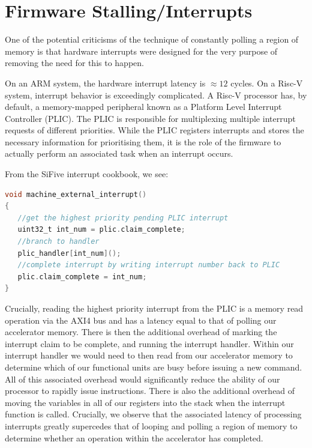 \documentclass[a4paper,8pt]{report}
\begin{document}
\section{Firmware Stalling/Interrupts}
One of the potential criticisms of the technique of constantly polling a region
of memory is that hardware interrupts were designed for the very purpose of
removing the need for this to happen.

On an ARM system, the hardware interrupt latency is $\approx 12$ cycles. On a
Risc-V system, interrupt behavior is exceedingly complicated. A Risc-V processor
has, by default, a memory-mapped peripheral known as a Platform Level Interrupt
Controller (PLIC). The PLIC is responsible for multiplexing multiple interrupt
requests of different priorities. While the PLIC registers interrupts and stores
the necessary information for prioritising them, it is the role of the firmware
to actually perform an associated task when an interrupt occurs.

From the SiFive interrupt cookbook, we see:
\begin{lstlisting}[language=C,style=customc]
void machine_external_interrupt()
{
   //get the highest priority pending PLIC interrupt
   uint32_t int_num = plic.claim_complete;
   //branch to handler
   plic_handler[int_num]();
   //complete interrupt by writing interrupt number back to PLIC
   plic.claim_complete = int_num;
}
\end{lstlisting}

Crucially, reading the highest priority interrupt from the PLIC is a memory
read operation via the AXI4 bus and has a latency equal to that of polling our
accelerator memory. There is then the additional overhead of marking the
interrupt claim to be complete, and running the interrupt handler. Within our
interrupt handler we would need to then read from our accelerator memory to
determine which of our functional units are busy before issuing a new command.
All of this associated overhead would significantly reduce the ability of our
processor to rapidly issue instructions. There is also the additional overhead
of moving the variables in all of our registers into the stack when the
interrupt function is called. Crucially, we observe that the associated latency
of processing interrupts greatly supercedes that of looping and polling a region
of memory to determine whether an operation within the accelerator has completed.
\end{document}

